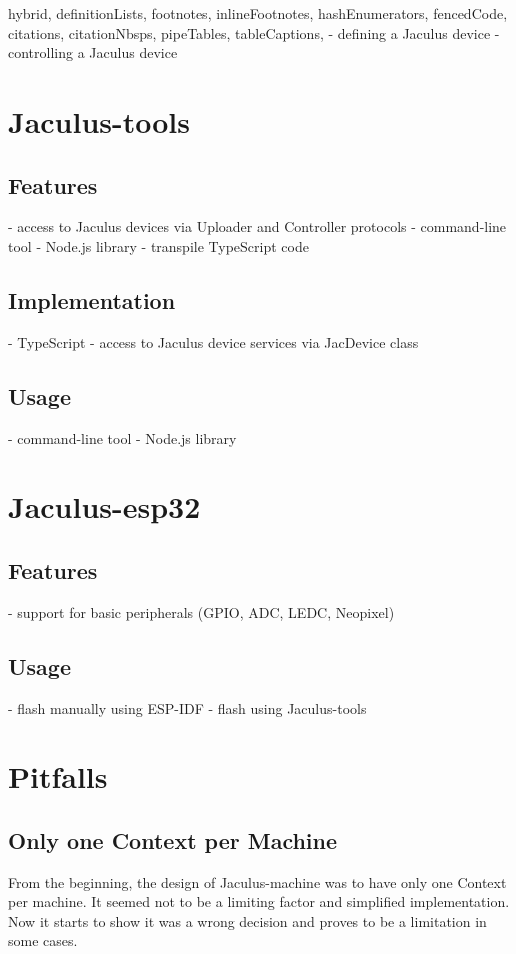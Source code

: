 \documentclass[
  digital,
  oneside,
  nosansbold,
  nocolorbold,
  lof,
  lot
]{fithesis4}
\begin{document}
\begin{markdown*}{%
  hybrid,
  definitionLists,
  footnotes,
  inlineFootnotes,
  hashEnumerators,
  fencedCode,
  citations,
  citationNbsps,
  pipeTables,
  tableCaptions,
}
  - defining a Jaculus device
  - controlling a Jaculus device


\chapter{Jaculus-tools}

\section{Features}

  - access to Jaculus devices via Uploader and Controller protocols
  - command-line tool
  - Node.js library
  - transpile TypeScript code

\section{Implementation}

  - TypeScript
  - access to Jaculus device services via JacDevice class

\section{Usage}

  - command-line tool
  - Node.js library


\chapter{Jaculus-esp32}

\section{Features}

  - support for basic peripherals (GPIO, ADC, LEDC, Neopixel)

\section{Usage}

  - flash manually using ESP-IDF
  - flash using Jaculus-tools


\chapter{Pitfalls}

\section{Only one Context per Machine}
From the beginning, the design of Jaculus-machine was to have only one Context per machine. It seemed not to be a limiting factor and simplified implementation. Now it starts to show it was a wrong decision and proves to be a limitation in some cases.


\end{markdown*}
\end{document}
